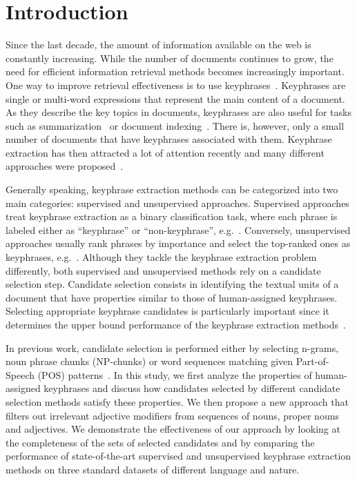 \section{Introduction}
\label{sec:section}

  Since the last decade, the amount of information available on the web is
  constantly increasing. While the number of documents continues to grow, the
  need for efficient information retrieval methods becomes increasingly
  important. One way to improve retrieval effectiveness is to use
  keyphrases~\cite{jones1999phrasier}. Keyphrases are single or multi-word
  expressions that represent the main content of a document. As they describe
  the key topics in documents, keyphrases are also useful for tasks such as
  summarization~\cite{avanzo2005keyphrase} or document
  indexing~\cite{medelyan2008smalltrainingset}. There is, however, only a small
  number of documents that have keyphrases associated with them. Keyphrase
  extraction has then attracted a lot of attention recently and many different
  approaches were proposed~\cite{hasan2014state_of_the_art}.

  Generally speaking, keyphrase extraction methods can be categorized into two
  main categories: supervised and unsupervised approaches. Supervised approaches
  treat keyphrase extraction as a binary classification task, where each phrase
  is labeled either as ``keyphrase'' or ``non-keyphrase'',
  e.g.~\cite{witten1999kea}. Conversely, unsupervised approaches usually rank
  phrases by importance and select the top-ranked ones as keyphrases,
  e.g.~\cite{mihalcea2004textrank}. Although they tackle the keyphrase
  extraction problem differently, both supervised and unsupervised methods rely
  on a candidate selection step. Candidate selection consists in identifying the
  textual units of a document that have properties similar to those of
  human-assigned keyphrases. Selecting appropriate keyphrase candidates is
  particularly important since it determines the upper bound performance of the
  keyphrase extraction methods~\cite{wang2014keyphraseextractionpreprocessing}.

  In previous work, candidate selection is performed either by selecting
  n-grams, noun phrase chunks (NP-chunks) or word sequences matching given
  Part-of-Speech (POS) patterns~\cite{hulth2003keywordextraction}. In this
  study, we first analyze the properties of human-assigned keyphrases and
  discuss how candidates selected by different candidate selection methods
  satisfy these properties. We then propose a new approach that filters out
  irrelevant adjective modifiers from sequences of nouns, proper nouns and
  adjectives. We demonstrate the effectiveness of our approach by looking at the
  completeness of the sets of selected candidates and by comparing the
  performance of state-of-the-art supervised and unsupervised keyphrase
  extraction methods on three standard datasets of different language and
  nature.

